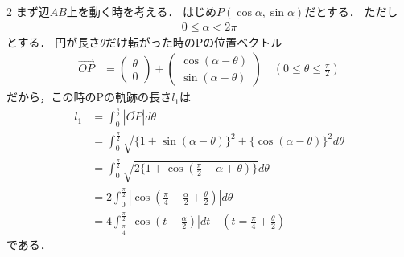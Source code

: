 \documentclass[../../../../main.tex]{subfiles}
\begin{document}
\begin{multicols}{2}
  まず辺$AB$上を動く時を考える．
  はじめ$P(\cos\alpha, \sin\alpha)$だとする．
  ただし
  \begin{align*}
    0 \le \alpha < 2\pi
  \end{align*}
  とする．
  円が長さ$\theta$だけ転がった時のPの位置ベクトル
  \begin{align*}
    \vec{OP}
     & = \begin{pmatrix} \theta \\ 0 \end{pmatrix} + \begin{pmatrix} \cos(\alpha-\theta) \\ \sin(\alpha-\theta) \end{pmatrix} \quad (0 \le \theta \le \frac{\pi}{2})
  \end{align*}
  だから，この時のPの軌跡の長さ$l_1$は
  \begin{align}
    l_1
     & = \int_{0}^{\frac{\pi}{2}} |\overline{OP}| d\theta                                                                                    \\
     & = \int_{0}^{\frac{\pi}{2}} \sqrt{\{1+\sin(\alpha-\theta)\}^2 + \{\cos(\alpha-\theta)\}^2} d\theta                                     \\
     & = \int_{0}^{\frac{\pi}{2}} \sqrt{2\{1+\cos(\frac{\pi}{2}-\alpha+\theta)\}} d\theta                                                    \\
     & = 2 \int_{0}^{\frac{\pi}{2}} |\cos(\frac{\pi}{4}-\frac{\alpha}{2}+\frac{\theta}{2})| d\theta                                          \\
     & = 4 \int_{\frac{\pi}{4}}^{\frac{\pi}{2}} |\cos(t-\frac{\alpha}{2})| dt \quad (t = \frac{\pi}{4}+\frac{\theta}{2}) \label{1994-2:eq:3}
  \end{align}
  である．


\end{multicols}
\end{document}
